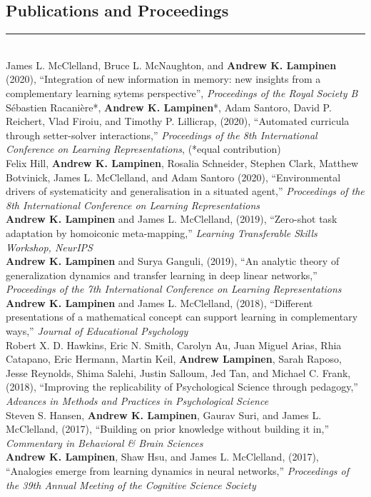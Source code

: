 \documentclass[margin]{res}
\begin{document}
\begin{resume}
\vspace{1pt}\section{Publications and Proceedings} \vspace{-15pt} \rule{\textwidth}{0.5pt} \\[3pt]
James L. McClelland, Bruce L. McNaughton, and \textbf{Andrew K. Lampinen} (2020), {``Integration of new information in memory: new insights from a complementary learning sytems perspective''}, \textit{Proceedings of the Royal Society B} \\[3pt]
S\'ebastien Racani\`ere*, \textbf{Andrew K. Lampinen}*, Adam Santoro, David P. Reichert, Vlad Firoiu, and Timothy P. Lillicrap, (2020), {``Automated curricula through setter-solver interactions,''} \textit{Proceedings of the 8th International Conference on Learning Representations}, (*equal contribution) \\ [3pt] 
Felix Hill, \textbf{Andrew K. Lampinen}, Rosalia Schneider, Stephen Clark, Matthew Botvinick, James L. McClelland, and Adam Santoro (2020), {``Environmental drivers of systematicity and generalisation in a situated agent,''} \textit{Proceedings of the 8th International Conference on Learning Representations} \\ [3pt] 
\textbf{Andrew K. Lampinen} and James L. McClelland, (2019), {``Zero-shot task adaptation by homoiconic meta-mapping,''} \textit{Learning Transferable Skills Workshop, NeurIPS} \\ [3pt] 
\textbf{Andrew K. Lampinen} and Surya Ganguli, (2019), {``An analytic theory of generalization dynamics and transfer learning in deep linear networks,''} \textit{Proceedings of the 7th International Conference on Learning Representations} \\[3pt] 
\textbf{Andrew K. Lampinen} and James L. McClelland, (2018), {``Different presentations of a mathematical concept can support learning in complementary ways,''} \textit{Journal of Educational Psychology} \\[3pt]
 Robert X. D. Hawkins, Eric N. Smith, Carolyn Au, Juan Miguel Arias, Rhia Catapano, Eric Hermann, Martin Keil, \textbf{Andrew Lampinen}, Sarah Raposo, Jesse Reynolds, Shima Salehi, Justin Salloum, Jed Tan, and Michael C. Frank, (2018), {``Improving the replicability of Psychological Science through pedagogy,''}  \textit{Advances in Methods and Practices in Psychological Science} \\ [3pt]
Steven S. Hansen, \textbf{Andrew K. Lampinen}, Gaurav Suri, and James L. McClelland, (2017), {``Building on prior knowledge without building it in,''} \textit{Commentary in Behavioral \& Brain Sciences}  \\[3pt]
\textbf{Andrew K. Lampinen}, Shaw Hsu, and James L. McClelland, (2017), {``Analogies emerge from learning dynamics in neural networks,''} \textit{Proceedings of the 39th Annual Meeting of the Cognitive Science Society}  


\end{resume}
\end{document}

